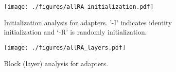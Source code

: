 \begin{figure}[h!]

\begin{center}

\texttt{[image: ./figures/allRA\_initialization.pdf]}
\end{center}
\vspace{-0.3in}
\caption{Initialization analysis for adapters. '-I' indicates identity initialization and `-R' is randomly initialization.}
\label{suppfig:init}
\end{figure}

\begin{figure}[h]
\begin{center}
\texttt{[image: ./figures/allRA\_layers.pdf]}
\end{center}
\vspace{-0.3in}
\caption{Block (layer) analysis for adapters.}
\label{suppfig:urllayers}

\end{figure}





